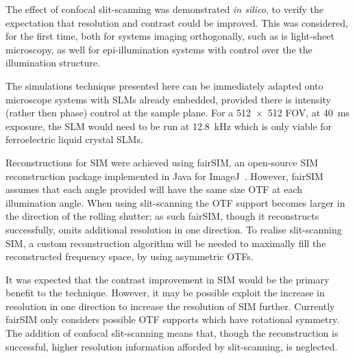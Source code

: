 The effect of confocal \gls{slit-scanning} was demonstrated \emph{in silico}, to verify the expectation that resolution and contrast could be improved. %
This was considered, for the first time, both for systems imaging orthogonally, such as is light-sheet microscopy, as well for epi-illumination systems with control over the the illumination structure.

The simulations technique presented here can be immediately adapted onto microscope systems with \gls{SLM}s already embedded, provided there is intensity (rather then phase) control at the sample plane.
For a \SI{512x512}{} \gls{FOV}, at \SI{40}{\milli\second} exposure, the \gls{SLM} would need to be run at \SI{12.8}{\kilo\hertz} which is only viable for ferroelectric liquid crystal \gls{SLM}s.

Reconstructions for \gls{SIM} were achieved using fairSIM, an open-source \gls{SIM} reconstruction package implemented in Java for ImageJ~\cite{mullerOpensourceImageReconstruction2016a}.
However, fairSIM assumes that each angle provided will have the same size \gls{OTF} at each illumination angle.
When using \gls{slit-scanning} the \gls{OTF} support becomes larger in the direction of the rolling shutter; as such fairSIM, though it reconstructs successfully, omits additional resolution in one direction.
To realise \gls{slit-scanning} \gls{SIM}, a custom reconstruction algorithm will be needed to maximally fill the reconstructed frequency space, by using asymmetric \gls{OTF}s.

It was expected that the contrast improvement in \gls{SIM} would be the primary benefit to the technique.
However, it may be possible exploit the increase in resolution in one direction to increase the resolution of \gls{SIM} further.
Currently fairSIM only considers possible \gls{OTF} supports which have rotational symmetry.
The addition of confocal \gls{slit-scanning} means that, though the reconstruction is successful, higher resolution information afforded by \gls{slit-scanning}, is neglected.

